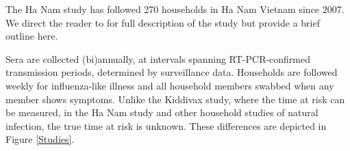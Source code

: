The Ha Nam study has followed 270 households in Ha Nam Vietnam since 2007. We direct the reader to \cite{Horby;2012} for full description of the study but provide a brief outline here.

Sera are collected (bi)annually, at intervals spanning RT-PCR-confirmed transmission periods, determined by surveillance data. Households are followed weekly for influenza-like illness and all household members swabbed when any member shows symptoms. Unlike the Kiddivax study, where the time at risk can be measured, in the Ha Nam study and other household studies of natural infection, the true time at risk is unknown. These differences are depicted in Figure \ref{Studies}.
